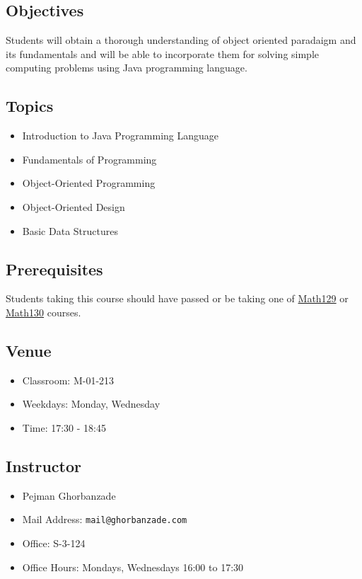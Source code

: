 \documentclass[12pt,letterpaper,twoside]{article}
\begin{document}


\subsection*{Objectives}
Students will obtain a thorough understanding of object oriented paradaigm and its fundamentals and will be able to incorporate them for solving simple computing problems using Java programming language.

\subsection*{Topics}
\begin{itemize}
\item[] Introduction to Java Programming Language
\item[] Fundamentals of Programming
\item[] Object-Oriented Programming
\item[] Object-Oriented Design
\item[] Basic Data Structures
\end{itemize}

\subsection*{Prerequisites}
	Students taking this course should have passed or be taking one of \href{http://www.math.umb.edu/courses/course_page.php?id=5}{Math129} or \href{http://www.math.umb.edu/courses/course_page.php?id=6}{Math130} courses.

\subsection*{Venue}
\begin{itemize}
\item[] Classroom: M-01-213
\item[] Weekdays: Monday, Wednesday
\item[] Time: 17:30 - 18:45
\end{itemize}

\subsection*{Instructor}
\begin{itemize}
\item[] Pejman Ghorbanzade
\item[] Mail Address: \texttt{mail@ghorbanzade.com}
\item[] Office: S-3-124
\item[] Office Hours: Mondays, Wednesdays 16:00 to 17:30
\end{itemize}
\end{document}
